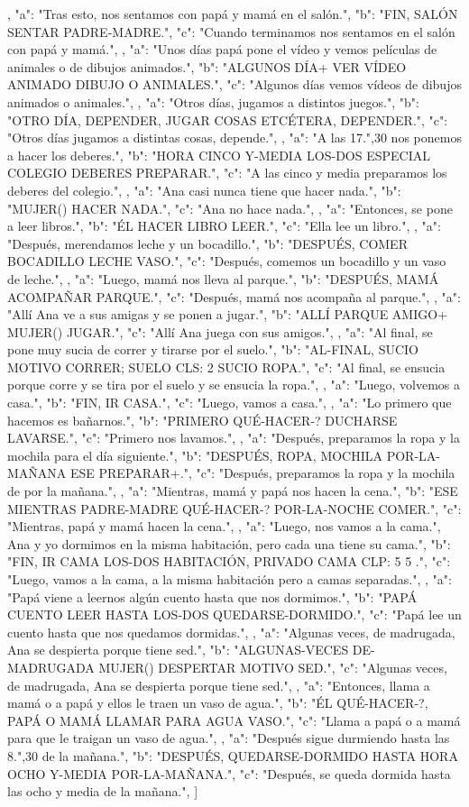 ,
{
"a": "Tras esto, nos sentamos con papá y mamá en el salón.",
"b": "FIN, SALÓN SENTAR PADRE-MADRE.",
"c": "Cuando terminamos nos sentamos en el salón con papá y mamá.",
}
,
{
"a": "Unos días papá pone el vídeo y vemos películas de animales o de dibujos animados.",
"b": "ALGUNOS DÍA+ VER VÍDEO ANIMADO DIBUJO O ANIMALES.",
"c": "Algunos días vemos vídeos de dibujos animados o animales.",
}
,
{
"a": "Otros días, jugamos a distintos juegos.",
"b": "OTRO DÍA, DEPENDER, JUGAR COSAS ETCÉTERA, DEPENDER.",
"c": "Otros días jugamos a distintas cosas, depende.",
}
,
{ 
"a": "A las 17.",30 nos ponemos a hacer los deberes.",
"b": "HORA CINCO Y-MEDIA LOS-DOS ESPECIAL COLEGIO DEBERES PREPARAR.",
"c": "A las cinco y media preparamos los deberes del colegio.",
}
,
{
"a": "Ana casi nunca tiene que hacer nada.",
"b": "MUJER() HACER NADA.",
"c": "Ana no hace nada.",
}
,
{
"a": "Entonces, se pone a leer libros.",
"b": "ÉL HACER LIBRO LEER.",
"c": "Ella lee un libro.",
}
,
{
"a": "Después, merendamos leche y un bocadillo.",
"b": "DESPUÉS, COMER BOCADILLO LECHE VASO.",
"c": "Después, comemos un bocadillo y un vaso de leche.",
}
,
{
"a": "Luego, mamá nos lleva al parque.",
"b": "DESPUÉS, MAMÁ ACOMPAÑAR PARQUE.",
"c": "Después, mamá nos acompaña al parque.",
}
,
{
"a": "Allí Ana ve a sus amigas y se ponen a jugar.",
"b": "ALLÍ PARQUE AMIGO+ MUJER() JUGAR.",
"c": "Allí Ana juega con sus amigos.",
}
,
{
"a": "Al final, se pone muy sucia de correr y tirarse por el suelo.",
"b": "AL-FINAL, SUCIO MOTIVO CORRER; SUELO CLS: 2  SUCIO ROPA.",
"c": "Al final, se ensucia porque corre y se tira por el suelo y se ensucia la ropa.",
}
,
{
"a": "Luego, volvemos a casa.",
"b": "FIN, IR CASA.",
"c": "Luego, vamos a casa.",
}
,
{
"a": "Lo primero que hacemos es bañarnos.",
"b": "PRIMERO QUÉ-HACER-? DUCHARSE LAVARSE.",
"c": "Primero nos lavamos.",
}
,
{
"a": "Después, preparamos la ropa y la mochila para el día siguiente.",
"b": "DESPUÉS, ROPA, MOCHILA POR-LA-MAÑANA ESE PREPARAR+.",
"c": "Después, preparamos la ropa y la mochila de por la mañana.",
}
,
{
"a": "Mientras, mamá y papá nos hacen la cena.",
"b": "ESE MIENTRAS PADRE-MADRE QUÉ-HACER-? POR-LA-NOCHE COMER.",
"c": "Mientras, papá y mamá hacen la cena.", 
}
,
{
"a": "Luego, nos vamos a la cama.", Ana y yo dormimos en la misma habitación, pero cada una tiene su cama.",
"b": "FIN, IR CAMA LOS-DOS HABITACIÓN, PRIVADO CAMA CLP: 5 5 .",
"c": "Luego, vamos a la cama, a la misma habitación pero a camas separadas.",
}
,
{
"a": "Papá viene a leernos algún cuento hasta que nos dormimos.",
"b": "PAPÁ CUENTO LEER HASTA LOS-DOS QUEDARSE-DORMIDO.",
"c": "Papá lee un cuento hasta que nos quedamos dormidas.",
}
,
{
"a": "Algunas veces, de madrugada, Ana se despierta porque tiene sed.",
"b": "ALGUNAS-VECES DE-MADRUGADA MUJER() DESPERTAR MOTIVO SED.",
"c": "Algunas veces, de madrugada, Ana se despierta porque tiene sed.",
}
,
{
"a": "Entonces, llama a mamá o a papá y ellos le traen un vaso de agua.",
"b": "ÉL QUÉ-HACER-?, PAPÁ O MAMÁ LLAMAR PARA AGUA VASO.",
"c": "Llama a papá o a mamá para que le traigan un vaso de agua.",
}
,
{
"a": "Después sigue durmiendo hasta las 8.",30 de la mañana.",
"b": "DESPUÉS, QUEDARSE-DORMIDO HASTA HORA OCHO Y-MEDIA POR-LA-MAÑANA.",
"c": "Después, se queda dormida hasta las ocho y media de la mañana.",
}
]
